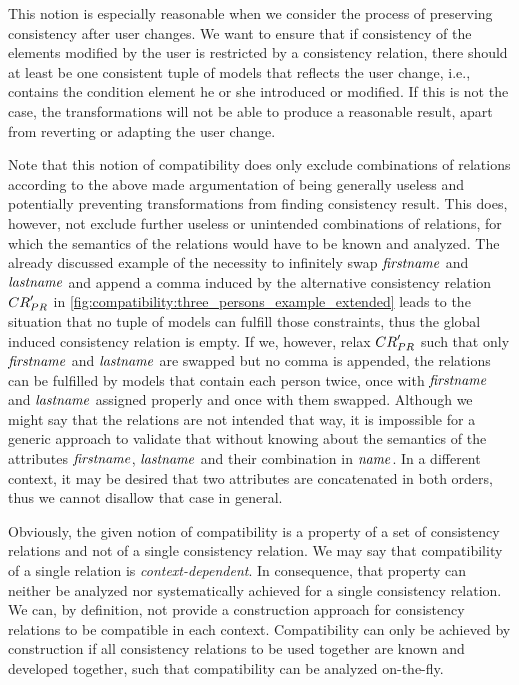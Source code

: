 This notion is especially reasonable when we consider the process of preserving consistency after user changes.
We want to ensure that if consistency of the elements modified by the user is restricted by a consistency relation, there should at least be one consistent tuple of models that reflects the user change, i.e., contains the condition element he or she introduced or modified.
If this is not the case, the transformations will not be able to produce a reasonable result, apart from reverting or adapting the user change.

Note that this notion of compatibility does only exclude combinations of relations according to the above made argumentation of being generally useless and potentially preventing transformations from finding consistency result.
This does, however, not exclude further useless or unintended combinations of relations, for which the semantics of the relations would have to be known and analyzed.
The already discussed example of the necessity to infinitely swap $\mathit{firstname}$ and $\mathit{lastname}$ and append a comma induced by the alternative consistency relation $\consistencyrelation{CR}{PR}'$ in \autoref{fig:compatibility:three_persons_example_extended} leads to the situation that no tuple of models can fulfill those constraints, thus the global induced consistency relation is empty.
If we, however, relax $\consistencyrelation{CR}{PR}'$ such that only $\mathit{firstname}$ and $\mathit{lastname}$ are swapped but no comma is appended, the relations can be fulfilled by models that contain each person twice, once with $\mathit{firstname}$ and $\mathit{lastname}$ assigned properly and once with them swapped.
Although we might say that the relations are not intended that way, it is impossible for a generic approach to validate that without knowing about the semantics of the attributes $\mathit{firstname}$, $\mathit{lastname}$ and their combination in $\mathit{name}$.
In a different context, it may be desired that two attributes are concatenated in both orders, thus we cannot disallow that case in general.

Obviously, the given notion of compatibility is a property of a set of consistency relations and not of a single consistency relation.
We may say that compatibility of a single relation is \emph{context-dependent}.
In consequence, that property can neither be analyzed nor systematically achieved for a single consistency relation.
We can, by definition, not provide a construction approach for consistency relations to be compatible in each context.
Compatibility can only be achieved by construction if all consistency relations to be used together are known and developed together, such that compatibility can be analyzed on-the-fly.


